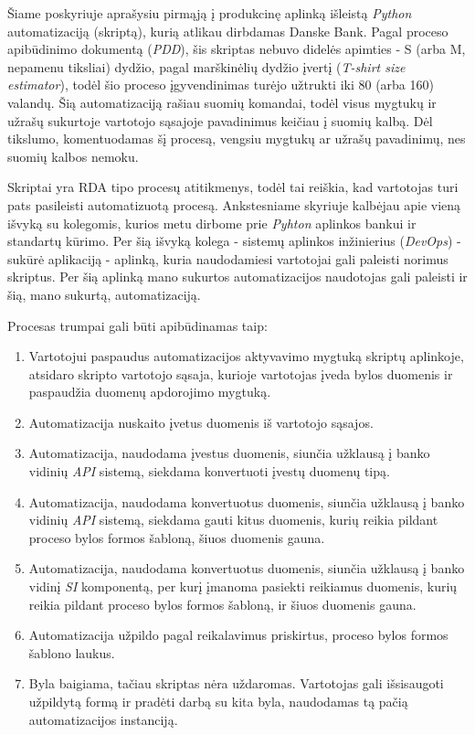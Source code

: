 \documentclass{VUMIFPSBakPrakAt}
\begin{document}
Šiame poskyriuje aprašysiu pirmąją į produkcinę aplinką išleistą \textit{Python} automatizaciją (skriptą), kurią atlikau dirbdamas Danske Bank. Pagal proceso apibūdinimo dokumentą (\textit{PDD}), šis skriptas nebuvo didelės apimties - S (arba M, nepamenu tiksliai) dydžio, pagal marškinėlių dydžio įvertį (\textit{T-shirt size estimator}), todėl šio proceso įgyvendinimas turėjo užtrukti iki 80 (arba 160) valandų. Šią automatizaciją rašiau suomių komandai, todėl visus mygtukų ir užrašų sukurtoje vartotojo sąsajoje pavadinimus keičiau į suomių kalbą. Dėl tikslumo, komentuodamas šį procesą, vengsiu mygtukų ar užrašų pavadinimų, nes suomių kalbos nemoku.
\par
Skriptai yra RDA tipo procesų atitikmenys, todėl tai reiškia, kad vartotojas turi pats pasileisti automatizuotą procesą. Ankstesniame skyriuje kalbėjau apie vieną išvyką su kolegomis, kurios metu dirbome prie \textit{Pyhton} aplinkos bankui ir standartų kūrimo. Per šią išvyką kolega - sistemų aplinkos inžinierius (\textit{DevOps}) - sukūrė aplikaciją - aplinką, kuria naudodamiesi vartotojai gali paleisti norimus skriptus. Per šią aplinką mano sukurtos automatizacijos naudotojas gali paleisti ir šią, mano sukurtą, automatizaciją.
\par
Procesas trumpai gali būti apibūdinamas taip:
\vspace{10pt}
\begin{enumerate}
    \item\label{item:script-start} Vartotojui paspaudus automatizacijos aktyvavimo mygtuką skriptų aplinkoje, atsidaro skripto vartotojo sąsaja, kurioje vartotojas įveda bylos duomenis ir paspaudžia duomenų apdorojimo mygtuką.
    \item\label{item:input} Automatizacija nuskaito įvetus duomenis iš vartotojo sąsajos.
    \item\label{item:api1} Automatizacija, naudodama įvestus duomenis, siunčia užklausą į banko vidinių \textit{API} sistemą, siekdama konvertuoti įvestų duomenų tipą.
    \item\label{item:api2} Automatizacija, naudodama konvertuotus duomenis, siunčia užklausą į banko vidinių \textit{API} sistemą, siekdama gauti kitus duomenis, kurių reikia pildant proceso bylos formos šabloną, šiuos duomenis gauna.
    \item\label{item:si} Automatizacija, naudodama konvertuotus duomenis, siunčia užklausą į banko vidinį \textit{SI} komponentą, per kurį įmanoma pasiekti reikiamus duomenis, kurių reikia pildant proceso bylos formos šabloną, ir šiuos duomenis gauna.
    \item\label{item:script-form} Automatizacija užpildo pagal reikalavimus priskirtus, proceso bylos formos šablono laukus.
    \item\label{item:script-end} Byla baigiama, tačiau skriptas nėra uždaromas. Vartotojas gali išsisaugoti užpildytą formą ir pradėti darbą su kita byla, naudodamas tą pačią automatizacijos instanciją.
\end{enumerate}
\end{document}
